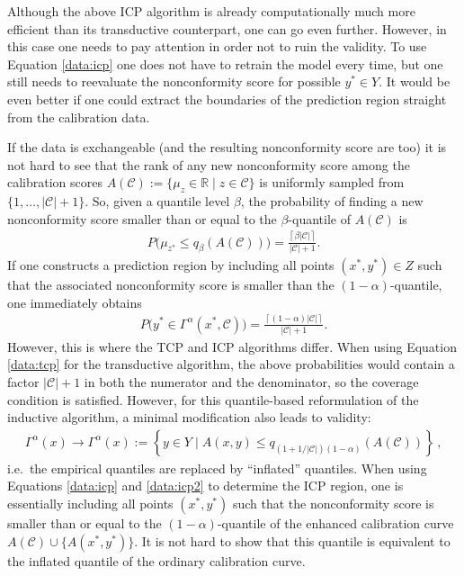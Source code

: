     \begin{property}[Validity]
        Although the above ICP algorithm is already computationally much more efficient than its transductive counterpart, one can go even further. However, in this case one needs to pay attention in order not to ruin the validity. To use Equation \eqref{data:icp} one does not have to retrain the model every time, but one still needs to reevaluate the nonconformity score for possible $y^*\in Y$. It would be even better if one could extract the boundaries of the prediction region straight from the calibration data.

        If the data is exchangeable (and the resulting nonconformity score are too) it is not hard to see that the rank of any new nonconformity score among the calibration scores $A(\mathcal{C}):=\{\mu_z\in\mathbb{R}\mid z\in\mathcal{C}\}$ is uniformly sampled from $\{1,\ldots,|\mathcal{C}|+1\}$. So, given a quantile level $\beta$, the probability of finding a new nonconformity score smaller than or equal to the $\beta$-quantile of $A(\mathcal{C})$ is
        \begin{gather}
            P\big(\mu_{z^*}\leq q_\beta(A(\mathcal{C}))\big) = \frac{\left\lceil\beta|\mathcal{C}|\right\rceil}{|\mathcal{C}|+1}.
        \end{gather}
        If one constructs a prediction region by including all points $(x^*,y^*)\in Z$ such that the associated nonconformity score is smaller than the $(1-\alpha)$-quantile, one immediately obtains
        \begin{gather}
            P\big(y^*\in\Gamma^\alpha(x^*,\mathcal{C})\big) = \frac{\left\lceil(1-\alpha)|\mathcal{C}|\right\rceil}{|\mathcal{C}|+1}.
        \end{gather}
        However, this is where the TCP and ICP algorithms differ. When using Equation \eqref{data:tcp} for the transductive algorithm, the above probabilities would contain a factor $|\mathcal{C}|+1$ in both the numerator and the denominator, so the coverage condition is satisfied. However, for this quantile-based reformulation of the inductive algorithm, a minimal modification also leads to validity:
        \begin{gather}
            \Gamma^\alpha(x)\longrightarrow\Gamma^\alpha(x) := \left\{y\in Y\mid A(x,y)\leq q_{(1+1/|\mathcal{C}|)(1-\alpha)}(A(\mathcal{C}))\right\}\,,
        \end{gather}
        i.e.~the empirical quantiles are replaced by ``inflated'' quantiles. When using Equations \eqref{data:icp} and \eqref{data:icp2} to determine the ICP region, one is essentially including all points $(x^*,y^*)$ such that the nonconformity score is smaller than or equal to the $(1-\alpha)$-quantile of the enhanced calibration curve $A(\mathcal{C})\cup\{A(x^*,y^*)\}$. It is not hard to show that this quantile is equivalent to the inflated quantile of the ordinary calibration curve.


\end{property}
